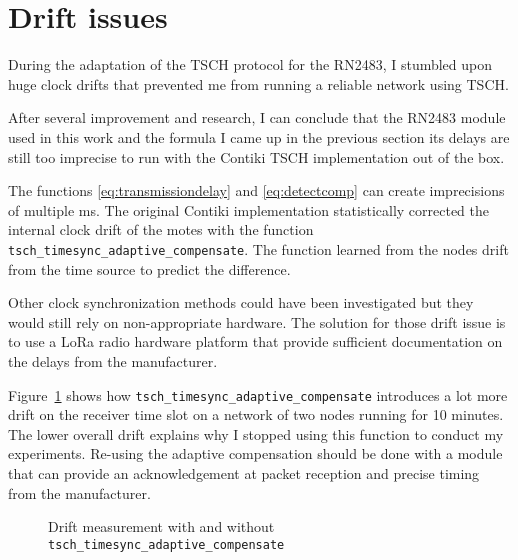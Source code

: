 
\section{Drift issues\label{section:driftissues}}

During the adaptation of the TSCH protocol for the RN2483, I stumbled upon huge
clock drifts that prevented me from running a reliable network using TSCH.

After several improvement and research, I can conclude that the RN2483
module used in this work and the formula I came up in the previous section its
delays are still too imprecise to run with the Contiki TSCH
implementation out of the box.

The functions \ref{eq:transmissiondelay} and \ref{eq:detectcomp} can
create imprecisions of multiple ms.
The original Contiki implementation statistically corrected the internal clock
drift of the motes with the function
\lstinline{tsch_timesync_adaptive_compensate}.
The function learned from the nodes drift from the time source to predict the
difference.

Other clock synchronization methods could have been investigated but they would
still rely on non-appropriate hardware.
The solution for those drift issue is to use a LoRa radio hardware platform
that provide sufficient documentation on the delays from the manufacturer.

Figure~\ref{fig:driftmeasurement} shows how
\lstinline{tsch_timesync_adaptive_compensate} introduces a lot more drift on the
receiver time slot on a network of two nodes running for 10 minutes.
The lower overall drift explains why I stopped using this function to conduct my experiments.
Re-using the adaptive compensation should be done with a module that can
provide an acknowledgement at packet reception and precise timing from the
manufacturer.

\begin{figure}[H]
  \centering
  \caption{Drift measurement with and without \lstinline{tsch_timesync_adaptive_compensate}\label{fig:driftmeasurement}}
\end{figure}

